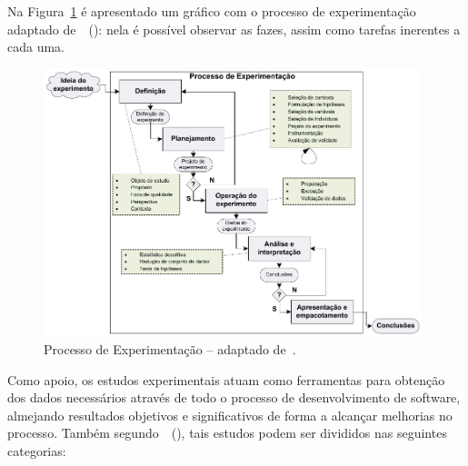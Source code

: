 
Na Figura~\ref{ideia} é apresentado um gráfico com o processo de experimentação adaptado de~~(\citeyear{Wohlin2012}): nela é possível observar as fazes, assim como tarefas inerentes a cada uma. 

\begin{figure}[!ht]
\centering
\includegraphics[width=0.98\textwidth]{images/Experimentacao.pdf}
\caption{Processo de Experimentação -- adaptado de~\cite{Wohlin2012}.}
\label{ideia}
\end{figure}

Como apoio, os estudos experimentais atuam como ferramentas para obtenção dos dados necessários através de todo o processo de desenvolvimento de software, almejando resultados objetivos e significativos de forma a alcançar melhorias no processo. Também segundo~~(\citeyear{Wohlin2012}), tais estudos podem ser divididos nas seguintes categorias:

